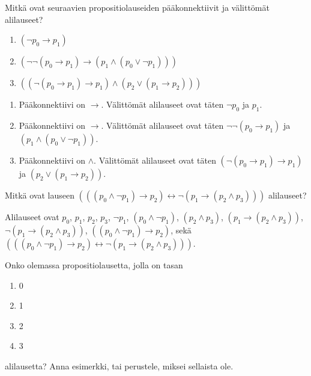\documentclass[11pt,a4paper]{amsart}
\begin{document}
\begin{exercise}
Mitkä ovat seuraavien propositiolauseiden pääkonnektiivit ja välittömät
alilauseet?
\begin{enumerate}[label=\alph*), nosep]
\item \((\neg p_0 \rightarrow p_1)\)
\item \((\neg \neg (p_0 \rightarrow p_1) \rightarrow (p_1 \land (p_0
\lor \neg p_1)))\)
\item \(((\neg(p_0 \rightarrow p_1) \rightarrow p_1) \land (p_2 \lor
(p_1 \rightarrow p_2)))\)
\end{enumerate}
\end{exercise}

\begin{solution}
\leavevmode\par
\begin{enumerate}[label=\alph*), nosep]
\item Pääkonnektiivi on \(\rightarrow\). Välittömät alilauseet ovat täten
\(\neg p_0\) ja \(p_1\).
\item Pääkonnektiivi on \(\rightarrow\). Välittömät alilauseet ovat täten
\(\neg \neg(p_0 \rightarrow p_1)\) ja \((p_1 \land (p_0 \lor \neg p_1))\).
\item Pääkonnektiivi on \(\land\). Välittömät alilauseet ovat täten
\((\neg(p_0 \rightarrow p_1) \rightarrow p_1)\) ja
\((p_2 \lor (p_1 \rightarrow p_2))\).
\end{enumerate}
\end{solution}

\begin{exercise}
Mitkä ovat lauseen
\((((p_0 \land \neg p_1) \rightarrow p_2) \leftrightarrow \neg(p_1
\rightarrow (p_2 \land p_3)))\)
alilauseet?
\end{exercise}

\begin{solution}
Alilauseet ovat \(p_0\), \(p_1\), \(p_2\), \(p_3\), \(\neg p_1\),
\((p_0 \land \neg p_1)\), \((p_2 \land p_3)\), \((p_1 \rightarrow
(p_2 \land p_3))\), \(\neg(p_1 \rightarrow (p_2 \land p_3))\),
\(((p_0 \land \neg p_1) \rightarrow p_2)\),
sekä \((((p_0 \land \neg p_1) \rightarrow p_2) \leftrightarrow \neg(p_1
\rightarrow (p_2 \land p_3)))\).
\end{solution}

\begin{exercise}
Onko olemassa propositiolausetta, jolla on tasan
\begin{enumerate}[label=\alph*), nosep]
\item 0
\item 1
\item 2
\item 3
\end{enumerate}
alilausetta? Anna esimerkki, tai perustele, miksei sellaista ole.
\end{exercise}
\end{document}
